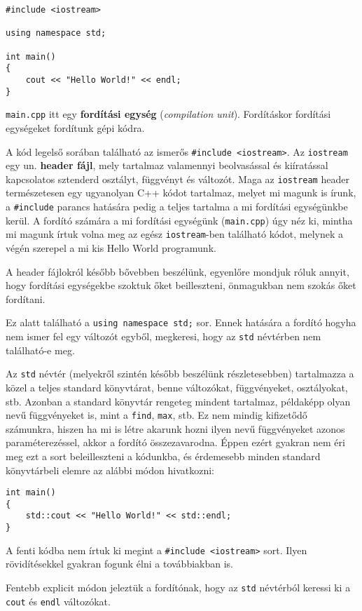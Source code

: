 \documentclass[a4paper,11.5pt,table]{article}
\begin{document}
	\medskip
	
	\begin{lstlisting}
#include <iostream>

using namespace std;
	
int main()
{
	cout << "Hello World!" << endl;
}
	\end{lstlisting}
	\texttt{main.cpp} itt egy \textbf{fordítási egység} (\textit{compilation unit}). Fordításkor fordítási egységeket fordítunk gépi kódra.
	
	A kód legelső sorában található az ismerős \texttt{\#include <iostream>}. Az \texttt{iostream} egy un. \textbf{header fájl}, mely tartalmaz valamennyi beolvasással és kiíratással kapcsolatos sztenderd osztályt, függvényt és változót. Maga az \texttt{iostream} header természetesen egy ugyanolyan C++ kódot tartalmaz, melyet mi magunk is írunk, a \texttt{\#include} parancs hatására pedig a teljes tartalma a mi fordítási egységünkbe kerül. A fordító számára a mi fordítási egységünk (\texttt{main.cpp}) úgy néz ki, mintha mi magunk írtuk volna meg az egész \texttt{iostream}-ben található kódot, melynek a végén szerepel a mi kis Hello World programunk.
	
	A header fájlokról később bővebben beszélünk, egyenlőre mondjuk róluk annyit, hogy fordítási egységekbe szoktuk őket beilleszteni, önmagukban nem szokás őket fordítani.
	
	\medskip
	Ez alatt található a \texttt{using namespace std;} sor. Ennek hatására a fordító hogyha nem ismer fel egy változót egyből, megkeresi, hogy az \texttt{std} névtérben nem található-e meg. 
	
	Az \texttt{std} névtér (melyekről szintén később beszélünk részletesebben) tartalmazza a közel a teljes standard könyvtárat, benne változókat, függvényeket, osztályokat, stb. Azonban a standard könyvtár rengeteg mindent tartalmaz, példaképp olyan nevű függvényeket is, mint a \texttt{find}, \texttt{max}, stb. Ez nem mindig kifizetődő számunkra, hiszen ha mi is létre akarunk hozni ilyen nevű függvényeket azonos paraméterezéssel, akkor a fordító összezavarodna. Éppen ezért gyakran nem éri meg ezt a sort beleilleszteni a kódunkba, és érdemesebb minden standard könyvtárbeli elemre az alábbi módon hivatkozni:
	\begin{lstlisting}
int main()
{
	std::cout << "Hello World!" << std::endl;
}
	\end{lstlisting}
	\begin{note}
		A fenti kódba nem írtuk ki megint a \texttt{\#include <iostream>} sort. Ilyen rövidítésekkel gyakran fogunk élni a továbbiakban is. 
	\end{note}
	Fentebb explicit módon jeleztük a fordítónak, hogy az \texttt{std} névtérból keressi ki a \texttt{cout} és \texttt{endl} változókat.
	
\end{document}
